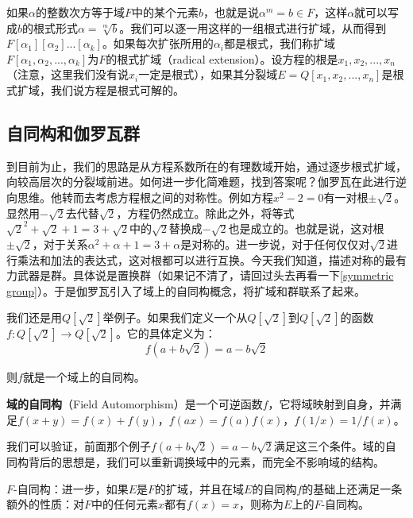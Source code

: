 \documentclass{article}
\begin{document}
如果$\alpha$的整数次方等于域$F$中的某个元素$b$，也就是说$\alpha^m = b \in F$，这样$\alpha$就可以写成$b$的根式形式$\alpha = \sqrt[m]{b}$。我们可以逐一用这样的一组根式进行扩域，从而得到$F[\alpha_1][\alpha_2]...[\alpha_k]$。如果每次扩张所用的$\alpha_i$都是根式，我们称扩域$F[\alpha_1, \alpha_2, ..., \alpha_k]$为$F$的根式扩域（radical extension）。设方程的根是$x_1, x_2, ..., x_n$（注意，这里我们没有说$x_i$一定是根式），如果其分裂域$E = Q[x_1, x_2, ..., x_n]$是根式扩域，我们说方程是根式可解的。

\begin{Exercise}
\end{Exercise}

\subsection{自同构和伽罗瓦群}

到目前为止，我们的思路是从方程系数所在的有理数域开始，通过逐步根式扩域，向较高层次的分裂域前进。如何进一步化简难题，找到答案呢？伽罗瓦在此进行逆向思维。他转而去考虑方程根之间的对称性。例如方程$x^2 - 2 = 0$有一对根$\pm \sqrt{2}$。显然用$-\sqrt{2}$去代替$\sqrt{2}$，方程仍然成立。除此之外，将等式$\sqrt{2}^2 + \sqrt{2} + 1 = 3 + \sqrt{2}$中的$\sqrt{2}$替换成$-\sqrt{2}$也是成立的。也就是说，这对根$\pm \sqrt{2}$，对于关系$\alpha^2 + \alpha + 1 = 3 + \alpha$是对称的。进一步说，对于任何仅仅对$\sqrt{2}$进行乘法和加法的表达式，这对根都可以进行互换。今天我们知道，描述对称的最有力武器是群。具体说是置换群（如果记不清了，请回过头去再看一下\ref{symmetric group}）。于是伽罗瓦引入了域上的自同构概念，将扩域和群联系了起来。

我们还是用$Q[\sqrt{2}]$举例子。如果我们定义一个从$Q[\sqrt{2}]$到$Q[\sqrt{2}]$的函数$f: Q[\sqrt{2}] \to Q[\sqrt{2}]$。它的具体定义为：
\[
f(a + b \sqrt{2}) = a - b \sqrt{2}
\]

则$f$就是一个域上的自同构。

\begin{definition}
\textbf{域的自同构}（Field Automorphism）是一个可逆函数$f$，它将域映射到自身，并满足$f(x + y) = f(x) + f(y)$，$f(ax) = f(a) f(x)$，$f(1/x) = 1/f(x)$。
\end{definition}

我们可以验证，前面那个例子$f(a + b \sqrt{2}) = a - b \sqrt{2}$满足这三个条件。域的自同构背后的思想是，我们可以重新调换域中的元素，而完全不影响域的结构。

\begin{definition}
$F$-自同构：进一步，如果$E$是$F$的扩域，并且在域$E$的自同构$f$的基础上还满足一条额外的性质：对$F$中的任何元素$x$都有$f(x) = x$，则称为$E$上的$F$-自同构。
\end{definition}
\end{document}
